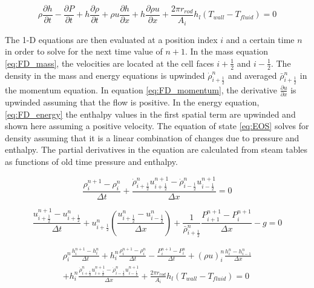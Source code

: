     \begin{equation}
    	\label{eq:1-D_energy_long}
    	\rho \frac{ \partial  h}{\partial t} -
    	     \frac{ \partial  P}{\partial t} + 
    	h    \frac{ \partial  \rho}{\partial t} +
    	\rho u \frac{ \partial h }{ \partial x} +
    	h    \frac{ \partial \rho u }{ \partial x} 
    	+ \frac{2\pi r_{rod}}{A_{i}}h_{l}\left(T_{wall}-T_{fluid}\right)
    	= 0
    \end{equation}
    
    The 1-D equations are then evaluated at a position index $ i $ and a certain
    time $n$ in order to solve for the next time value of $n+1$. In the mass equation
    \eqref{eq:FD_mass}, the velocities are located at the cell faces
    $i+\frac{1}{2}$ and $i-\frac{1}{2}$. The density  in the mass and energy
    equations is upwinded $\dot{\rho}_{i+\frac{1}{2}}^{n}$ and averaged
    $\bar{\rho}_{i+\frac{1}{2}}^{n}$ in the momentum equation. In equation
    \eqref{eq:FD_momentum}, the derivative $\frac{ \partial u}{ \partial x}$ is
    upwinded assuming that the flow is positive. In the energy equation,
    \eqref{eq:FD_energy} the enthalpy values in the first spatial term are
    upwinded and shown here assuming a positive velocity. The equation of state
    \eqref{eq:EOS} solves for density assuming that it is a linear combination
    of changes due to pressure and enthalpy. The partial derivatives in the
    equation are calculated from steam tables as functions of old time pressure
    and enthalpy.
    
    \begin{equation}
    	\label{eq:FD_mass}
    	\frac{ \rho_{i}^{n+1}-\rho_{i}^{n}}{ \Delta t} +
    	\frac{ \dot{\rho}_{i+\frac{1}{2}}^{n} u_{i+\frac{1}{2}}^{n+1}  -
    	\dot{\rho}_{i-\frac{1}{2}}^{n}  u_{i-\frac{1}{2}}^{n+1} }{\Delta x}
    	 = 0
    \end{equation}
    
    \begin{equation}
    	\label{eq:FD_momentum}
    	\frac{  u_{i+\frac{1}{2}}^{n+1} - u_{i+\frac{1}{2}}^{n} }{ \Delta t } + 
    	u_{i+\frac{1}{2}}^{n} \left( \frac{  u_{i+\frac{1}{2}}^{n} -
    	u_{i-\frac{1}{2}}^{n}}{ \Delta x} \right) +
    	\frac{1}{\bar{\rho}_{i+\frac{1}{2}}^{n} } 
    	\frac{ P_{i+1}^{n+1} -P_{i}^{n+1} }{ \Delta x } - g
    	= 0
    \end{equation}
    
    \begin{multline}
    	\label{eq:FD_energy}
    	\rho_{i}^{n} \frac{ h_{i}^{n+1} - h_{i}^{n}}{\Delta t} 
    	+ h_{i}^{n} \frac{ \rho_{i}^{n+1} - \rho_{i}^{n}}{\Delta t} 
    	- \frac{P_{i}^{n+1}-P_{i}^{n}}{\Delta t}
    	+ \left( \rho u \right)_{i}^{n} 
    		\frac{   h _{i}^{n}  - h _{i-1}^{n} }{\Delta x}  \\
    	+ h _{i}^{n} \frac{ \dot{\rho}_{i+\frac{1}{2}}^{n} u_{i+\frac{1}{2}}^{n+1} 
    	- \dot{\rho}_{i-\frac{1}{2}}^{n}  u_{i-\frac{1}{2}}^{n+1} }{\Delta x}
    	+ \frac{2\pi r_{rod}}{A_{i}}h_{l}\left(T_{wall}-T_{fluid}\right)
    	= 0
    \end{multline}
    
